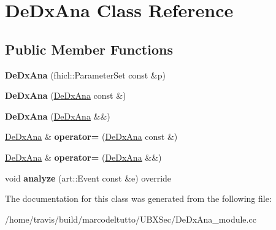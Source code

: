 \hypertarget{classDeDxAna}{\section{\-De\-Dx\-Ana \-Class \-Reference}
\label{classDeDxAna}
}
\subsection*{\-Public \-Member \-Functions}
\begin{DoxyCompactItemize}
\item 
\hypertarget{classDeDxAna_aafa017bdd99fff476da1a0fc5ea67722}{{\bfseries \-De\-Dx\-Ana} (fhicl\-::\-Parameter\-Set const \&p)}\label{classDeDxAna_aafa017bdd99fff476da1a0fc5ea67722}

\item 
\hypertarget{classDeDxAna_ae7e0a9f6e1db3755e4654823b34fcde4}{{\bfseries \-De\-Dx\-Ana} (\hyperlink{classDeDxAna}{\-De\-Dx\-Ana} const \&)}\label{classDeDxAna_ae7e0a9f6e1db3755e4654823b34fcde4}

\item 
\hypertarget{classDeDxAna_aad15dd4536f28285b7c09a592bf7754f}{{\bfseries \-De\-Dx\-Ana} (\hyperlink{classDeDxAna}{\-De\-Dx\-Ana} \&\&)}\label{classDeDxAna_aad15dd4536f28285b7c09a592bf7754f}

\item 
\hypertarget{classDeDxAna_a9742e2fc78c3b77f1bc7bf275913cf0a}{\hyperlink{classDeDxAna}{\-De\-Dx\-Ana} \& {\bfseries operator=} (\hyperlink{classDeDxAna}{\-De\-Dx\-Ana} const \&)}\label{classDeDxAna_a9742e2fc78c3b77f1bc7bf275913cf0a}

\item 
\hypertarget{classDeDxAna_acfafa21db320eff1ed8bf4acd021991c}{\hyperlink{classDeDxAna}{\-De\-Dx\-Ana} \& {\bfseries operator=} (\hyperlink{classDeDxAna}{\-De\-Dx\-Ana} \&\&)}\label{classDeDxAna_acfafa21db320eff1ed8bf4acd021991c}

\item 
\hypertarget{classDeDxAna_a997e03e16044d2e5c8603cc6578c43c3}{void {\bfseries analyze} (art\-::\-Event const \&e) override}\label{classDeDxAna_a997e03e16044d2e5c8603cc6578c43c3}

\end{DoxyCompactItemize}


\-The documentation for this class was generated from the following file\-:\begin{DoxyCompactItemize}
\item 
/home/travis/build/marcodeltutto/\-U\-B\-X\-Sec/\-De\-Dx\-Ana\-\_\-module.\-cc\end{DoxyCompactItemize}
